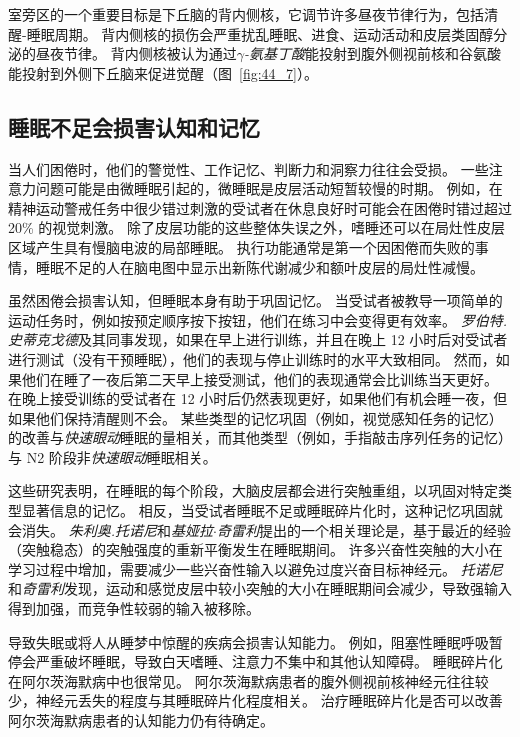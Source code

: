 室旁区的一个重要目标是下丘脑的背内侧核，它调节许多昼夜节律行为，包括清醒-睡眠周期。
背内侧核的损伤会严重扰乱睡眠、进食、运动活动和皮层类固醇分泌的昼夜节律。
背内侧核被认为通过\textit{$\gamma$-氨基丁酸}能投射到腹外侧视前核和谷氨酸能投射到外侧下丘脑来促进觉醒（图~\ref{fig:44_7}）。



\subsection{睡眠不足会损害认知和记忆}

当人们困倦时，他们的警觉性、工作记忆、判断力和洞察力往往会受损。
一些注意力问题可能是由微睡眠引起的，微睡眠是皮层活动短暂较慢的时期。
例如，在精神运动警戒任务中很少错过刺激的受试者在休息良好时可能会在困倦时错过超过 20\% 的视觉刺激。
除了皮层功能的这些整体失误之外，嗜睡还可以在局灶性皮层区域产生具有慢脑电波的局部睡眠。
执行功能通常是第一个因困倦而失败的事情，睡眠不足的人在脑电图中显示出新陈代谢减少和额叶皮层的局灶性减慢。


虽然困倦会损害认知，但睡眠本身有助于巩固记忆。
当受试者被教导一项简单的运动任务时，例如按预定顺序按下按钮，他们在练习中会变得更有效率。
\textit{罗伯特.史蒂克戈德}及其同事发现，如果在早上进行训练，并且在晚上 12 小时后对受试者进行测试（没有干预睡眠），他们的表现与停止训练时的水平大致相同。
然而，如果他们在睡了一夜后第二天早上接受测试，他们的表现通常会比训练当天更好。
在晚上接受训练的受试者在 12 小时后仍然表现更好，如果他们有机会睡一夜，但如果他们保持清醒则不会。
某些类型的记忆巩固（例如，视觉感知任务的记忆）的改善与\textit{快速眼动}睡眠的量相关，而其他类型（例如，手指敲击序列任务的记忆）与 N2 阶段非\textit{快速眼动}睡眠相关。


这些研究表明，在睡眠的每个阶段，大脑皮层都会进行突触重组，以巩固对特定类型显著信息的记忆。
相反，当受试者睡眠不足或睡眠碎片化时，这种记忆巩固就会消失。
\textit{朱利奥.托诺尼}和\textit{基娅拉$\cdot$奇雷利}提出的一个相关理论是，基于最近的经验（突触稳态）的突触强度的重新平衡发生在睡眠期间。
许多兴奋性突触的大小在学习过程中增加，需要减少一些兴奋性输入以避免过度兴奋目标神经元。
\textit{托诺尼}和\textit{奇雷利}发现，运动和感觉皮层中较小突触的大小在睡眠期间会减少，导致强输入得到加强，而竞争性较弱的输入被移除。


导致失眠或将人从睡梦中惊醒的疾病会损害认知能力。
例如，阻塞性睡眠呼吸暂停会严重破坏睡眠，导致白天嗜睡、注意力不集中和其他认知障碍。
睡眠碎片化在阿尔茨海默病中也很常见。
阿尔茨海默病患者的腹外侧视前核神经元往往较少，神经元丢失的程度与其睡眠碎片化程度相关。
治疗睡眠碎片化是否可以改善阿尔茨海默病患者的认知能力仍有待确定。



